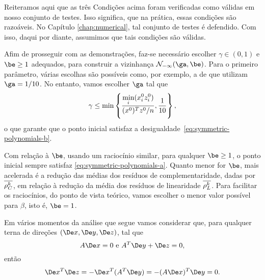 Reiteramos aqui que  as três Condições acima foram verificadas como válidas em nosso conjunto de testes. Isso significa, que na prática, essas condições são razoáveis. No Capítulo \ref{chap:numerical}, tal conjunto de testes é defendido. Com isso, daqui por diante, assumimos que tais condições são válidas. 






Afim de prosseguir com as demonstrações, faz-se necessário  escolher  $\gamma\in(0,1)$  e $\be\geq 1$ adequados, para construir a vizinhança $\Nset_{-\infty}(\ga,\be)$. Para o primeiro parâmetro, várias escolhas são possíveis como, por exemplo, a de 
\textcite{Colombo:2008ia} que utilizam $\ga = 1/10$. No entanto, vamos escolher $\ga$ tal que  
\[
\gamma \leq  \min\left\{ \frac{\displaystyle \min_{i}(x^0_{i} z^0_{i} )}{(x^0 )^Tz^0 /n}, \frac{1}{10}\right\},
\]
o que garante que o ponto inicial satisfaz a desigualdade~\eqref{eq:symmetric-polynomials-b}.

Com relação à $\be$,  usando um raciocínio similar, para qualquer  $\be\geq 1$, o ponto inicial sempre satisfaz \eqref{eq:symmetric-polynomials-a}. Quanto menor for $\be$, mais acelerada é a redução  das médias dos resíduos de complementaridade, dadas por $\overline{\rho_C^k }$, em relação à redução da média dos resíduos de linearidade $\overline{\rho_L^{k}}$. Para facilitar os raciocínios, do ponto de vista teórico, vamos escolher o menor valor possível para $\beta$, isto é, $\be=1$.


\begin{obs}
	Em vários momentos da análise que segue vamos considerar que, para qualquer terna de direções $(\Dex,\Dey,\Dez)$,  tal que 
\begin{equation}
	\label{eq:Ax0-ATyz0}
	A\Dex=0 \text{ e } A^T\Dey + \Dez = 0,
\end{equation}
então
\begin{equation}
	\label{eq:xTziszero}
	\Dex^T\Dez =  - \Dex^T(A^T\Dey)  = -(A\Dex)^T\Dey = 0.
\end{equation}
\end{obs}



